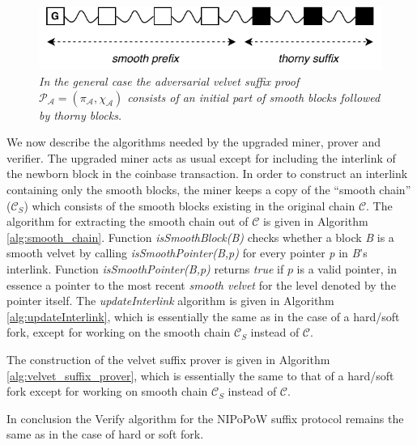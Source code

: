 \begin{figure}[h!]
	\begin{center}
		\includegraphics[scale=0.75]{figures/adversarial_velvet_proof.pdf}
	\end{center}
	\caption{\textit{In the general case the adversarial velvet suffix proof $\mathcal{P_A} = (\pi_\mathcal{A}, \chi_\mathcal{A})$ consists of an initial part of smooth blocks followed by thorny blocks.}}
	\label{fig:adversarial_velvet_proof}
\end{figure}
We now describe the algorithms needed by the upgraded miner, prover and verifier. The upgraded miner acts as usual except for including the interlink of the newborn block in the coinbase transaction. In order to construct an interlink containing only the smooth blocks, the miner keeps a copy of the ``smooth chain'' ($\mathcal{C}_S$) which consists of the smooth blocks existing in the original chain $\mathcal{C}$. The algorithm for extracting the smooth chain out of $\mathcal{C}$ is given in Algorithm \ref{alg:smooth_chain}. Function \textit{isSmoothBlock(B)} checks whether a block \textit{B} is a smooth velvet by calling \textit{isSmoothPointer(B,p)} for every pointer \textit{p} in \textit{B}'s interlink. Function \textit{isSmoothPointer(B,p)} returns \emph{true} if $p$ is a valid pointer, in essence a pointer to the most recent \emph{smooth velvet} for the level denoted by the pointer itself. The \textit{updateInterlink} algorithm is given in Algorithm \ref{alg:updateInterlink}, which is essentially the same as in the case of a hard/soft fork, except for working on the smooth chain $\mathcal{C}_S$ instead of $\mathcal{C}$.

The construction of the velvet suffix prover is given in Algorithm \ref{alg:velvet_suffix_prover}, which is essentially the same to that of a hard/soft fork except for working on smooth chain $\mathcal{C}_S$ instead of $\mathcal{C}$.

In conclusion the Verify algorithm for the NIPoPoW suffix protocol remains the same as in the case of hard or soft fork.

